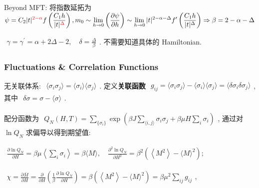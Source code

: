 \documentclass[../../main.tex]{subfiles}
\begin{document}
Beyond MFT: 将指数延拓为 $\begin{aligned}
    \psi = C_{2}|t|^{{\color{red}{2-\alpha}}}f\left(\frac{C_{1}h}{|t|^{{\color{red}{\Delta}}}}\right), m_{0} \sim \lim_{h\rightarrow 0}\left(\frac{\partial\psi}{\partial h}\right)\sim \lim_{h\rightarrow 0}|t|^{2-\alpha-\Delta}f^{\prime}\left(\frac{C_{1}h}{|t|^{\Delta}}\right)\Rightarrow \beta = 2-\alpha-\Delta
\end{aligned}$

$\begin{aligned}
    \gamma = \gamma^{\prime} = \alpha + 2\Delta - 2, \quad \delta = \frac{\Delta}{\beta}
\end{aligned}$. 不需要知道具体的 Hamiltonian. 

\subsubsection{Fluctuations \& Correlation Functions}

无关联体系: $\begin{aligned}
    \langle\sigma_{i}\sigma_{j}\rangle = \langle\sigma_{i}\rangle\langle\sigma_{j}\rangle
\end{aligned}$. 定义\textbf{关联函数} $\begin{aligned}
    g_{ij} = \langle\sigma_{i}\sigma_{j}\rangle - \langle\sigma_{i}\rangle\langle\sigma_{j}\rangle = \langle\delta\sigma_{i}\delta\sigma_{j}\rangle
\end{aligned}$, 其中 $\begin{aligned}
        \delta\sigma = \sigma - \langle\sigma\rangle
\end{aligned}$.

配分函数为 $\begin{aligned}
    Q_{N}(H,T) = \sum_{\{\sigma_{i}\}}\exp{\left(
        \beta J\sum_{\langle i,j\rangle}\sigma_{i}\sigma_{j}+\beta\mu H\sum_{i}\sigma_{i}
    \right)}
\end{aligned}$, 通过对 $\ln{Q_{N}}$ 求偏导以得到期望值: 

$\begin{aligned}
    \frac{\partial\ln{Q_{N}}}{\partial H} = \beta\mu\left\langle\sum_{i}\sigma_{i}\right\rangle = \beta\langle M\rangle,\quad \frac{\partial^{2}\ln{Q_{N}}}{\partial H^{2}} = \beta^{2}\left(\left\langle M^{2}\right\rangle - \langle M\rangle^{2}\right);
\end{aligned}$

$\begin{aligned}
    \chi = \frac{\partial\overline{M}}{\partial H} = \frac{\partial}{\partial H}\left(\frac{1}{\beta}\frac{\partial\ln{Q_{N}}}{\partial H}\right)= \beta\left(\left\langle M^{2}\right\rangle - \langle M\rangle^{2}\right) = \beta\mu^{2}\sum_{ij}g_{ij}
\end{aligned}$, 
\end{document}
